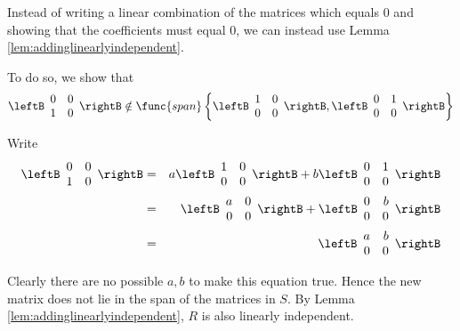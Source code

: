 \begin{solution}
Instead of writing a linear combination of the matrices which equals
$0$ and showing that the coefficients must equal $0$, we can instead
use Lemma \ref{lem:addinglinearlyindependent}.

To do so, we show that 
\[
\leftB \begin{array}{rr}
0 & 0 \\
1 & 0 
\end{array} \rightB
\notin
\func{span}\left\{ \leftB \begin{array}{rr}
1 & 0 \\
0 & 0 
\end{array} \rightB, \leftB \begin{array}{rr}
0 & 1 \\
0 & 0 
\end{array} \rightB \right\}
\]

Write 
\begin{eqnarray*}
\leftB \begin{array}{rr}
0 & 0 \\
1 & 0 
\end{array} \rightB
&=&  a\leftB \begin{array}{rr}
1 & 0 \\
0 & 0 
\end{array} \rightB +  b\leftB \begin{array}{rr}
0 & 1 \\
0 & 0 
\end{array} \rightB \\
&=&
\leftB \begin{array}{rr}
a & 0 \\
0 & 0 
\end{array} \rightB +  \leftB \begin{array}{rr}
0 & b \\
0 & 0 
\end{array} \rightB \\
&=& \leftB \begin{array}{rr}
a & b \\
0 & 0 
\end{array} \rightB
\end{eqnarray*}

Clearly there are no possible $a,b$ to make this equation true. Hence the new matrix does not lie in the span of the matrices in $S$. By Lemma \ref{lem:addinglinearlyindependent}, $R$ is also linearly independent.
\end{solution}
